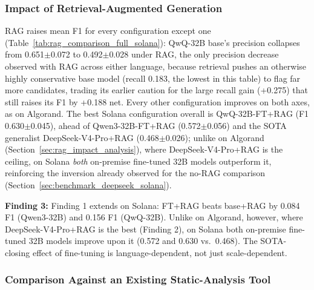\documentclass[lettersize,journal]{IEEEtran}
\newcommand{\finding}[2]{\par\noindent\colorbox{gray!12}{\parbox{0.965\linewidth}{\vspace{0.15cm}\textbf{Finding
#1:} #2\vspace{0.15cm}}}\par\vspace{0.25cm}}
\begin{document}
\subsubsection{Impact of Retrieval-Augmented Generation}
\label{sec:rag_impact_analysis_solana}

RAG raises mean F1 for every configuration except one (Table~\ref{tab:rag_comparison_full_solana}):
QwQ-32B base's precision collapses from 0.651$\pm$0.072 to 0.492$\pm$0.028 under RAG, the only
precision decrease observed with RAG across either language, because retrieval pushes an
otherwise highly conservative base model (recall 0.183, the lowest in this table) to flag far more
candidates, trading its earlier caution for the large recall gain (+0.275) that still raises its F1
by +0.188 net. Every other configuration improves on both axes, as on Algorand. The best Solana
configuration overall is QwQ-32B-FT+RAG (F1 0.630$\pm$0.045), ahead of Qwen3-32B-FT+RAG
(0.572$\pm$0.056) and the SOTA generalist DeepSeek-V4-Pro+RAG (0.468$\pm$0.026); unlike on
Algorand (Section~\ref{sec:rag_impact_analysis}), where DeepSeek-V4-Pro+RAG is the ceiling, on
Solana \emph{both} on-premise fine-tuned 32B models outperform it, reinforcing the inversion already
observed for the no-RAG comparison (Section~\ref{sec:benchmark_deepseek_solana}).

\finding{3}{Finding 1 extends on Solana: FT+RAG beats base+RAG by 0.084 F1 (Qwen3-32B) and 
0.156 F1 (QwQ-32B). Unlike on Algorand,
however, where DeepSeek-V4-Pro+RAG is the best (Finding 2), on Solana both on-premise
fine-tuned 32B models improve upon it (0.572 and 0.630 vs.\ 0.468). The SOTA-closing effect of
fine-tuning is language-dependent, not just scale-dependent.}

\subsubsection{Comparison Against an Existing Static-Analysis Tool}
\label{sec:static_tool_comparison_solana}
\end{document}
